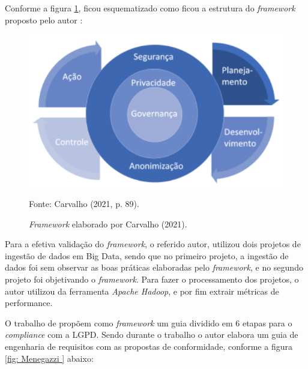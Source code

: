 \documentclass[
	12pt,				%
	openright,			%
	oneside,			%
	a4paper,			%
	english,			%
	french,				%
	spanish,			%
	brazil,				%
	]{abntex2}
\begin{document}
Conforme a figura \ref{fig: Carvalho }, ficou esquematizado como ficou a estrutura do \textit{framework} proposto pelo autor \cite{Carvalho2021}:

\begin{figure}[ht]
    \centering
    \caption{\textit{Framework} elaborado por Carvalho (2021).}
    \includegraphics[width=6in]{Images/08Carvalho2021.png}
    \label{fig: Carvalho }
    
    \centering \small Fonte: Carvalho (2021, p. 89).
\end{figure}

Para a efetiva validação do \textit{framework}, o referido autor, utilizou dois projetos de ingestão de dados em Big Data, sendo que no primeiro projeto, a ingestão de dados foi sem observar as boas práticas elaboradas pelo \textit{framework}, e no segundo projeto foi objetivando o \textit{framework}. Para fazer o processamento dos projetos, o autor utilizou da ferramenta \textit{Apache Hadoop}, e por fim extrair métricas de performance.

\pagebreak
O trabalho de \cite{Menegazzi2021} propõem como \textit{framework}  um guia dividido em 6 etapas para o \textit{compliance} com a LGPD. Sendo durante o trabalho o autor elabora um guia de engenharia de requisitos com as propostas de conformidade, conforme a figura \ref{fig: Menegazzi } abaixo: 
\end{document}
